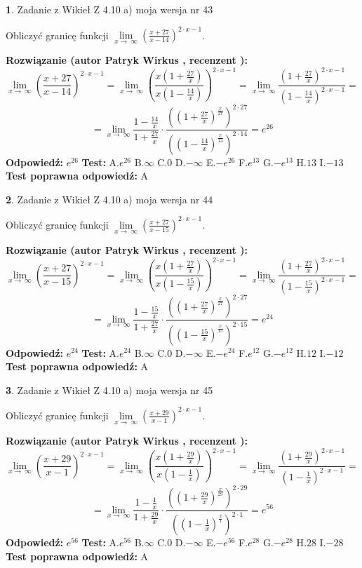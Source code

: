 \documentclass[12pt, a4paper]{article}
\theoremstyle{definition} %
\newtheorem{zad}{}
\newcommand{\zadStart}[1]{\begin{zad}#1\newline}
\newcommand{\zadStop}{\end{zad}}
\newcommand{\rozwStart}[2]{\noindent \textbf{Rozwiązanie (autor #1 , recenzent #2): }\newline}
\newcommand{\rozwStop}{\newline}
\newcommand{\odpStart}{\noindent \textbf{Odpowiedź:}\newline}
\newcommand{\odpStop}{\newline}
\newcommand{\testStart}{\noindent \textbf{Test:}\newline}
\newcommand{\testStop}{\newline}
\newcommand{\kluczStart}{\noindent \textbf{Test poprawna odpowiedź:}\newline}
\newcommand{\kluczStop}{\newline}
\begin{document}
\zadStart{Zadanie z Wikieł Z 4.10 a) moja wersja nr 43}

Obliczyć granicę funkcji  $\lim\limits_{x\to\ \infty}(\frac{x+27}{x-14})^{2\cdot x-1}$.
\zadStop
\rozwStart{Patryk Wirkus}{}
$$\lim\limits_{x\to\ \infty}(\frac{x+27}{x-14})^{2\cdot x-1} = \lim\limits_{x\to\ \infty}(\frac{x(1+\frac{27}{x})}{x(1-\frac{14}{x})})^{2\cdot x-1}=\lim\limits_{x\to\ \infty}\frac{(1+\frac{27}{x})^{2\cdot x-1}}{(1-\frac{14}{x})^{2\cdot x-1}}=$$
$$=\lim\limits_{x\to\ \infty}\frac{1-\frac{14}{x}}{1+\frac{27}{x}}\cdot\frac{((1+\frac{27}{x})^{\frac{x}{27}})^{2\cdot27}}{((1-\frac{14}{x})^{\frac{x}{14}})^{2\cdot14}}=e^{26}$$
\rozwStop
\odpStart
$e^{26}$
\odpStop
\testStart
A.$e^{26}$ B.$\infty$ C.$0$ D.$-\infty$ E.$-e^{26}$
F.$e^{13}$ G.$-e^{13}$
H.$13$
I.$-13$
\testStop
\kluczStart
A
\kluczStop



\zadStart{Zadanie z Wikieł Z 4.10 a) moja wersja nr 44}

Obliczyć granicę funkcji  $\lim\limits_{x\to\ \infty}(\frac{x+27}{x-15})^{2\cdot x-1}$.
\zadStop
\rozwStart{Patryk Wirkus}{}
$$\lim\limits_{x\to\ \infty}(\frac{x+27}{x-15})^{2\cdot x-1} = \lim\limits_{x\to\ \infty}(\frac{x(1+\frac{27}{x})}{x(1-\frac{15}{x})})^{2\cdot x-1}=\lim\limits_{x\to\ \infty}\frac{(1+\frac{27}{x})^{2\cdot x-1}}{(1-\frac{15}{x})^{2\cdot x-1}}=$$
$$=\lim\limits_{x\to\ \infty}\frac{1-\frac{15}{x}}{1+\frac{27}{x}}\cdot\frac{((1+\frac{27}{x})^{\frac{x}{27}})^{2\cdot27}}{((1-\frac{15}{x})^{\frac{x}{15}})^{2\cdot15}}=e^{24}$$
\rozwStop
\odpStart
$e^{24}$
\odpStop
\testStart
A.$e^{24}$ B.$\infty$ C.$0$ D.$-\infty$ E.$-e^{24}$
F.$e^{12}$ G.$-e^{12}$
H.$12$
I.$-12$
\testStop
\kluczStart
A
\kluczStop



\zadStart{Zadanie z Wikieł Z 4.10 a) moja wersja nr 45}

Obliczyć granicę funkcji  $\lim\limits_{x\to\ \infty}(\frac{x+29}{x-1})^{2\cdot x-1}$.
\zadStop
\rozwStart{Patryk Wirkus}{}
$$\lim\limits_{x\to\ \infty}(\frac{x+29}{x-1})^{2\cdot x-1} = \lim\limits_{x\to\ \infty}(\frac{x(1+\frac{29}{x})}{x(1-\frac{1}{x})})^{2\cdot x-1}=\lim\limits_{x\to\ \infty}\frac{(1+\frac{29}{x})^{2\cdot x-1}}{(1-\frac{1}{x})^{2\cdot x-1}}=$$
$$=\lim\limits_{x\to\ \infty}\frac{1-\frac{1}{x}}{1+\frac{29}{x}}\cdot\frac{((1+\frac{29}{x})^{\frac{x}{29}})^{2\cdot29}}{((1-\frac{1}{x})^{\frac{x}{1}})^{2\cdot1}}=e^{56}$$
\rozwStop
\odpStart
$e^{56}$
\odpStop
\testStart
A.$e^{56}$ B.$\infty$ C.$0$ D.$-\infty$ E.$-e^{56}$
F.$e^{28}$ G.$-e^{28}$
H.$28$
I.$-28$
\testStop
\kluczStart
A
\kluczStop
\end{document}
